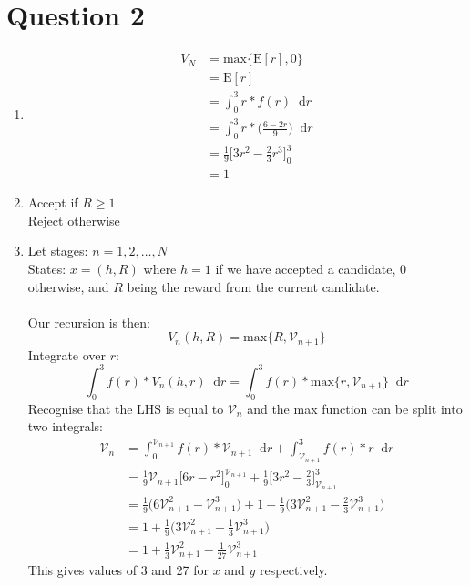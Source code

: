 \documentclass[10pt,a4paper]{article}
\newcommand*\diff{\mathop{}\!\mathrm{d}}
\begin{document}
\section*{Question 2}
\begin{enumerate}
	\item \begin{align*}
	V_N &= \text{max}\{\text{E}[r], 0\} \\
	&= \text{E}[r] \\
	&= \int^3_0 r * f(r) \diff r \\
	&= \int^3_0 r * \bigg(\frac{6-2r}{9}\bigg) \diff r \\
	&= \frac{1}{9} \bigg[3r^2-\frac{2}{3}r^3\bigg]^3_0 \\
	&= 1
	\end{align*}
	
	\item Accept if \(R \geq 1\) \\
	Reject otherwise
	
	\item Let stages: \(n = 1, 2, \dots, N\) \\
	States: \(x = (h, R)\) where \(h = 1\) if we have accepted a candidate, 0 otherwise, and \(R\) being the reward from the current candidate. \\ \\
	Our recursion is then:
	\begin{equation*}
	V_n(h, R) = \text{max}\{R, \mathcal{V}_{n+1}\}
	\end{equation*}
	Integrate over \(r\):
	\begin{equation*}
	\int^3_0 f(r) * V_n(h, r) \diff r = \int^3_0 f(r) * \text{max}\{r, \mathcal{V}_{n+1}\} \diff r
	\end{equation*}
	Recognise that the LHS is equal to \(\mathcal{V}_n\) and the max function can be split into two integrals:
	\begin{align*}
	\mathcal{V}_n &= \int^{\mathcal{V}_{n+1}}_0 f(r) * \mathcal{V}_{n+1} \diff r
	+ \int^3_{\mathcal{V}_{n+1}} f(r) * r \diff r \\
	&= \frac{1}{9}\mathcal{V}_{n+1}\bigg[6r-r^2\bigg]^{\mathcal{V}_{n+1}}_0 + \frac{1}{9}\bigg[3r^2-\frac{2}{3}\bigg]^3_{\mathcal{V}_{n+1}} \\
	&= \frac{1}{9}\bigg(6\mathcal{V}_{n+1}^2 - \mathcal{V}_{n+1}^3\bigg) + 1 - \frac{1}{9}\bigg(3\mathcal{V}_{n+1}^2-\frac{2}{3}\mathcal{V}_{n+1}^3\bigg) \\
	&= 1 + \frac{1}{9}\bigg(3\mathcal{V}_{n+1}^2 - \frac{1}{3}\mathcal{V}_{n+1}^3\bigg) \\
	&= 1 + \frac{1}{3}\mathcal{V}_{n+1}^2 - \frac{1}{27}\mathcal{V}_{n+1}^3
	\end{align*}
	This gives values of 3 and 27 for \(x\) and \(y\) respectively.
\end{enumerate}	
	
\end{document}
